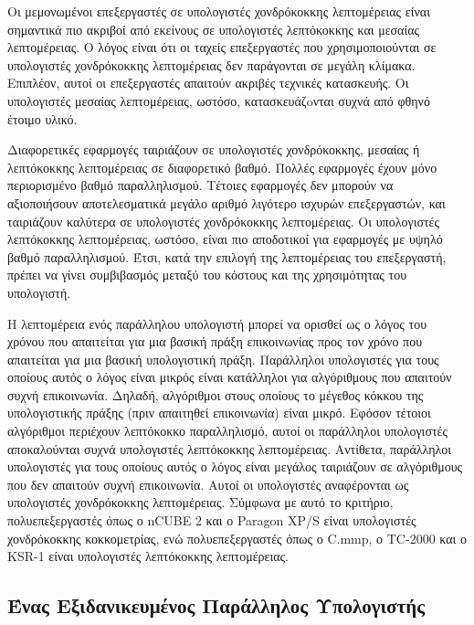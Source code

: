 \documentclass[12pt,a4paper]{article}
\begin{document}
Οι μεμονωμένοι επεξεργαστές σε υπολογιστές χονδρόκοκκης λεπτομέρειας 
είναι σημαντικά πιο ακριβοί από εκείνους σε υπολογιστές λεπτόκοκκης και 
μεσαίας λεπτομέρειας. Ο λόγος είναι ότι οι ταχείς επεξεργαστές που 
χρησιμοποιούνται σε υπολογιστές χονδρόκοκκης λεπτομέρειας δεν παράγονται 
σε μεγάλη κλίμακα. Επιπλέον, αυτοί οι επεξεργαστές απαιτούν ακριβές 
τεχνικές κατασκευής. Οι υπολογιστές μεσαίας λεπτομέρειας, ωστόσο, 
κατασκευάζoνται συχνά από φθηνό έτοιμο υλικό.

Διαφορετικές εφαρμογές ταιριάζουν σε υπολογιστές χονδρόκοκκης, μεσαίας ή
λεπτόκοκκης λεπτομέρειας σε διαφορετικό βαθμό. Πολλές εφαρμογές έχουν μόνο
περιορισμένο βαθμό παραλληλισμού. Τέτοιες εφαρμογές δεν μπορούν να αξιοποιήσουν
αποτελεσματικά μεγάλο αριθμό λιγότερο ισχυρών επεξεργαστών, και ταιριάζουν
καλύτερα σε υπολογιστές χονδρόκοκκης λεπτομέρειας. Οι υπολογιστές λεπτόκοκκης
λεπτομέρειας, ωστόσο, είναι πιο αποδοτικοί για εφαρμογές με υψηλό βαθμό
παραλληλισμού. Έτσι, κατά την επιλογή της λεπτομέρειας του επεξεργαστή, πρέπει να
γίνει συμβιβασμός μεταξύ του κόστους και της χρησιμότητας του υπολογιστή.

Η λεπτομέρεια ενός παράλληλου υπολογιστή μπορεί να ορισθεί ως ο λόγος του
χρόνου που απαιτείται για μια βασική πράξη επικοινωνίας προς τον χρόνο που
απαιτείται για μια βασική υπολογιστική πράξη. Παράλληλοι υπολογιστές για τους
οποίους αυτός ο λόγος είναι μικρός είναι κατάλληλοι για αλγόριθμους που απαιτούν
συχνή επικοινωνία. Δηλαδή, αλγόριθμοι στους οποίους το μέγεθος κόκκου της υπολογιστικής
πράξης (πριν απαιτηθεί επικοινωνία) είναι μικρό. Εφόσον τέτοιοι αλγόριθμοι
περιέχουν λεπτόκοκκο παραλληλισμό, αυτοί οι παράλληλοι υπολογιστές αποκαλούνται
συχνά υπολογιστές λεπτόκοκκης λεπτομέρειας. Αντίθετα, παράλληλοι υπολογιστές για
τους οποίους αυτός ο λόγος είναι μεγάλος ταιριάζουν σε αλγόριθμους που δεν
απαιτούν συχνή επικοινωνία. Αυτοί οι υπολογιστές αναφέρονται ως υπολογιστές
χονδρόκοκκης λεπτομέρειας. Σύμφωνα με αυτό το κριτήριο, πολυεπεξεργαστές όπως ο
\foreignlanguage{english}{nCUBE 2} και ο \foreignlanguage{english}{Paragon XP/S} είναι υπολογιστές χονδρόκοκκης κοκκομετρίας, ενώ
πολυεπεξεργαστές όπως ο \foreignlanguage{english}{C.mmp}, ο \foreignlanguage{english}{TC-2000} και ο \foreignlanguage{english}{KSR-1} είναι υπολογιστές
λεπτόκοκκης λεπτομέρειας.

\subsection{Ένας Εξιδανικευμένος Παράλληλος Υπολογιστής}
\end{document}
